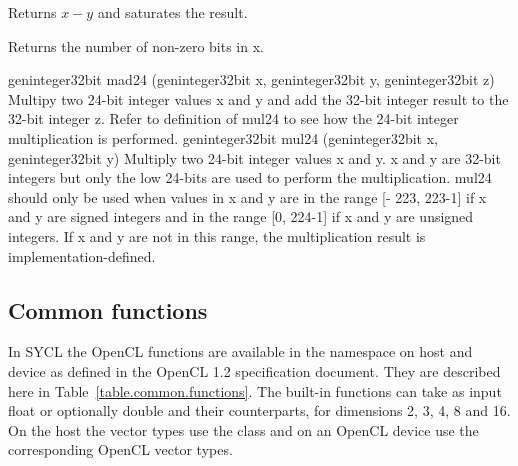 { Returns $x - y$ and saturates the result.}

{}

{}

{}

{}

{}

{}

{ Returns the number of non-zero bits in x.}

\addRow
{geninteger32bit mad24 (geninteger32bit x, geninteger32bit y, geninteger32bit z)}
{
Multipy two 24-bit integer values x and y and add
the 32-bit integer result to the 32-bit integer z.
Refer to definition of mul24 to see how the 24-bit
integer multiplication is performed.
}
\addRow
{geninteger32bit mul24 (geninteger32bit x, geninteger32bit y)}
{
Multiply two 24-bit integer values x and y. x and y
are 32-bit integers but only the low 24-bits are used
to perform the multiplication. mul24 should only
be used when values in x and y are in the range [-
223, 223-1] if x and y are signed integers and in the
range [0, 224-1] if x and y are unsigned integers. If
x and y are not in this range, the multiplication
result is implementation-defined.
}
\completeTable

\subsection{Common functions}
In SYCL the OpenCL  functions are available in the namespace
 on host and device as defined in the OpenCL 1.2 specification
document\cite[par. 6.12.4]{opencl12}. They are described here in
Table~\ref{table.common.functions}. The built-in functions can take as input
float or optionally double and their  counterparts, for dimensions
2, 3, 4, 8 and 16. On the host the vector types use the
 class and on an OpenCL device use the
corresponding OpenCL vector types.

